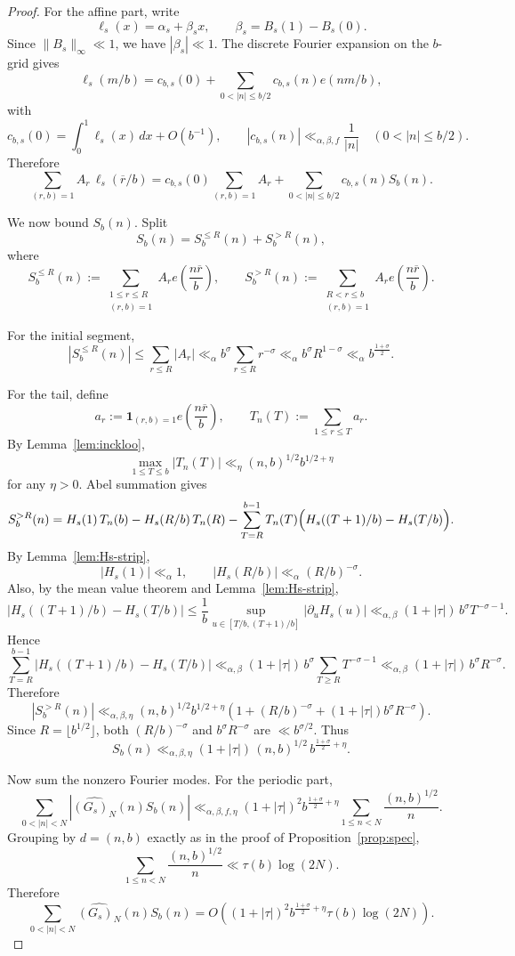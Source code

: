 \documentclass[a4paper,american,11pt]{amsart}
\theoremstyle{plain}
\theoremstyle{definition}
\newcommand{\ind}{\mathbf 1}
\begin{document}
\begin{proof}
For the affine part, write
\[
\ell_s(x)=\alpha_s+\beta_s x,
\qquad \beta_s=B_s(1)-B_s(0).
\]
Since \(\|B_s\|_\infty\ll1\), we have \(|\beta_s|\ll1\). The discrete Fourier expansion on the \(b\)-grid gives
\[
\ell_s(m/b)=c_{b,s}(0)+\sum_{0<|n|\le b/2}c_{b,s}(n)e(nm/b),
\]
with
\[
c_{b,s}(0)=\int_0^1 \ell_s(x)\,dx+O(b^{-1}),
\qquad
|c_{b,s}(n)|\ll_{\alpha,\beta,f}\frac{1}{|n|}
\quad (0<|n|\le b/2).
\]
Therefore
\[
\sum_{(r,b)=1}A_r\,\ell_s(\overline r/b)
=
c_{b,s}(0)\sum_{(r,b)=1}A_r
+
\sum_{0<|n|\le b/2}c_{b,s}(n)S_b(n).
\]

We now bound \(S_b(n)\). Split
\[
S_b(n)=S_b^{\le R}(n)+S_b^{>R}(n),
\]
where
\[
S_b^{\le R}(n):=\sum_{\substack{1\le r\le R\\(r,b)=1}}A_r e\!\left(\frac{n\overline r}{b}\right),
\qquad
S_b^{>R}(n):=\sum_{\substack{R<r\le b\\(r,b)=1}}A_r e\!\left(\frac{n\overline r}{b}\right).
\]

For the initial segment,
\[
|S_b^{\le R}(n)|
\le
\sum_{r\le R}|A_r|
\ll_\alpha
b^\sigma\sum_{r\le R}r^{-\sigma}
\ll_\alpha
b^\sigma R^{1-\sigma}
\ll_\alpha
b^{\frac{1+\sigma}{2}}.
\]

For the tail, define
\[
a_r:=\ind_{(r,b)=1}e\!\left(\frac{n\overline r}{b}\right),
\qquad
T_n(T):=\sum_{1\le r\le T}a_r.
\]
By Lemma~\ref{lem:inckloo},
\[
\max_{1\le T\le b}|T_n(T)|
\ll_\eta
(n,b)^{1/2}b^{1/2+\eta}
\]
for any \(\eta>0\). Abel summation gives
\[
S_b^{>R}(n)
=
H_s(1)\,T_n(b)-H_s(R/b)\,T_n(R)
-\sum_{T=R}^{b-1}T_n(T)\Bigl(H_s((T+1)/b)-H_s(T/b)\Bigr).
\]
By Lemma~\ref{lem:Hs-strip},
\[
|H_s(1)|\ll_\alpha 1,
\qquad
|H_s(R/b)|\ll_\alpha (R/b)^{-\sigma}.
\]
Also, by the mean value theorem and Lemma~\ref{lem:Hs-strip},
\[
|H_s((T+1)/b)-H_s(T/b)|
\le
\frac1b\sup_{u\in[T/b,(T+1)/b]}|\partial_u H_s(u)|
\ll_{\alpha,\beta}
(1+|\tau|)\,b^\sigma T^{-\sigma-1}.
\]
Hence
\[
\sum_{T=R}^{b-1}|H_s((T+1)/b)-H_s(T/b)|
\ll_{\alpha,\beta}
(1+|\tau|)\,b^\sigma\sum_{T\ge R}T^{-\sigma-1}
\ll_{\alpha,\beta}
(1+|\tau|)\,b^\sigma R^{-\sigma}.
\]
Therefore
\[
|S_b^{>R}(n)|
\ll_{\alpha,\beta,\eta}
(n,b)^{1/2}b^{1/2+\eta}
\left(
1+(R/b)^{-\sigma}+(1+|\tau|)b^\sigma R^{-\sigma}
\right).
\]
Since \(R=\lfloor b^{1/2}\rfloor\), both \((R/b)^{-\sigma}\) and \(b^\sigma R^{-\sigma}\) are
\(\ll b^{\sigma/2}\). Thus
\[
S_b(n)\ll_{\alpha,\beta,\eta}
(1+|\tau|)\,(n,b)^{1/2}\,b^{\frac{1+\sigma}{2}+\eta}.
\]

Now sum the nonzero Fourier modes. For the periodic part,
\[
\sum_{0<|n|<N}|\widehat{(G_s)_N}(n)S_b(n)|
\ll_{\alpha,\beta,f,\eta}
(1+|\tau|)^2 b^{\frac{1+\sigma}{2}+\eta}
\sum_{1\le n<N}\frac{(n,b)^{1/2}}{n}.
\]
Grouping by \(d=(n,b)\) exactly as in the proof of Proposition~\ref{prop:spec},
\[
\sum_{1\le n<N}\frac{(n,b)^{1/2}}{n}
\ll \tau(b)\log(2N).
\]
Therefore
\[
\sum_{0<|n|<N}\widehat{(G_s)_N}(n)S_b(n)
=
O\!\left((1+|\tau|)^2 b^{\frac{1+\sigma}{2}+\eta}\tau(b)\log(2N)\right).
\]


\end{proof}
\end{document}
